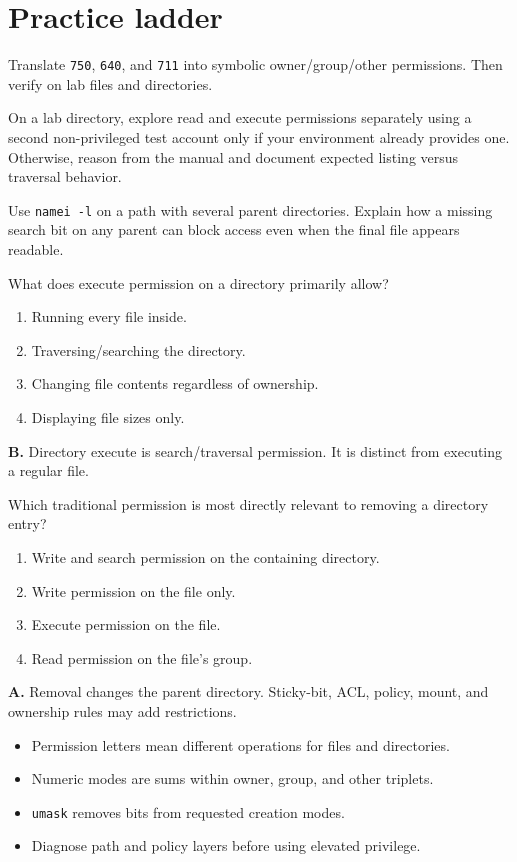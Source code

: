 \documentclass[11pt,oneside,openany]{book}
\newcommand{\fourchoices}[4]{%
  \begin{enumerate}[label=\Alph*),leftmargin=2em,itemsep=0.25em]
    \item #1
    \item #2
    \item #3
    \item #4
  \end{enumerate}}
\begin{document}
\section{Practice ladder}
\begin{practicebox}[title={Easy -- decode modes}]
Translate \texttt{750}, \texttt{640}, and \texttt{711} into symbolic owner/group/other permissions. Then verify on lab files and directories.
\end{practicebox}
\begin{practicebox}[title={Medium -- directory semantics}]
On a lab directory, explore read and execute permissions separately using a second non-privileged test account only if your environment already provides one. Otherwise, reason from the manual and document expected listing versus traversal behavior.
\end{practicebox}
\begin{practicebox}[title={Hard -- diagnose before elevation}]
Use \texttt{namei -l} on a path with several parent directories. Explain how a missing search bit on any parent can block access even when the final file appears readable.
\end{practicebox}

\begin{questionbox}[title={Medium 7.1 -- Directory permission}]
What does execute permission on a directory primarily allow?
\fourchoices{Running every file inside.}{Traversing/searching the directory.}{Changing file contents regardless of ownership.}{Displaying file sizes only.}
\end{questionbox}
\begin{answerbox}
\textbf{B.} Directory execute is search/traversal permission. It is distinct from executing a regular file.
\end{answerbox}

\begin{questionbox}[title={Hard 7.2 -- Removing a file}]
Which traditional permission is most directly relevant to removing a directory entry?
\fourchoices{Write and search permission on the containing directory.}{Write permission on the file only.}{Execute permission on the file.}{Read permission on the file's group.}
\end{questionbox}
\begin{answerbox}
\textbf{A.} Removal changes the parent directory. Sticky-bit, ACL, policy, mount, and ownership rules may add restrictions.
\end{answerbox}

\begin{recapbox}
\begin{itemize}
  \item Permission letters mean different operations for files and directories.
  \item Numeric modes are sums within owner, group, and other triplets.
  \item \texttt{umask} removes bits from requested creation modes.
  \item Diagnose path and policy layers before using elevated privilege.
\end{itemize}
\end{recapbox}
\end{document}
